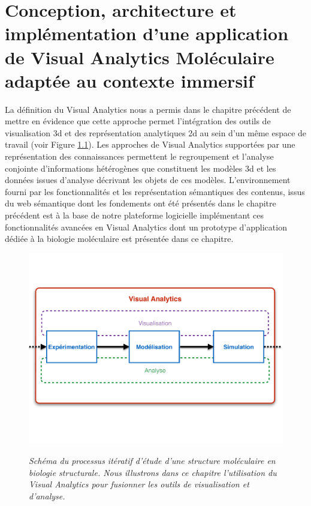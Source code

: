 
\chapter[Conception, architecture et implémentation d'une application de Visual Analytics Moléculaire adaptée au contexte immersif]{Conception, architecture et implémentation d'une application de Visual Analytics Moléculaire adaptée au contexte immersif}
\label{Sec:visuAna}
\minitoc
\cleardoublepage

La définition du Visual Analytics nous a permis dans le chapitre précédent de mettre en évidence que cette approche permet l'intégration des outils de visualisation 3d et des représentation analytiques 2d au sein d'un même espace de travail (voir Figure \ref{Fig:process_bio_struct_VA}). Les approches de Visual Analytics supportées par une représentation des connaissances permettent le regroupement et l'analyse conjointe d'informations hétérogènes que constituent les modèles 3d et les données issues d'analyse décrivant les objets de ces modèles. L'environnement fourni par les fonctionnalités et les représentation sémantiques des contenus, issus du web sémantique dont les fondements ont été présentés dans le chapitre précédent est à la base de notre plateforme logicielle implémentant ces fonctionnalités avancées en Visual Analytics dont un prototype d'application dédiée à la biologie moléculaire est présentée dans ce chapitre.

\begin{figure}
  \centering
  {\includegraphics[width=1.0\linewidth]{./figures/ch5/process_bio_struct_VA}}
    \caption[Schéma du processus itératif d'étude d'une structure moléculaire en biologie structurale.]{\it Schéma du processus itératif d'étude d'une structure moléculaire en biologie structurale. Nous illustrons dans ce chapitre l'utilisation du Visual Analytics pour fusionner les outils de visualisation et d'analyse.}
  \label{Fig:process_bio_struct_VA}
  \hspace{0.3cm}
\end{figure}


